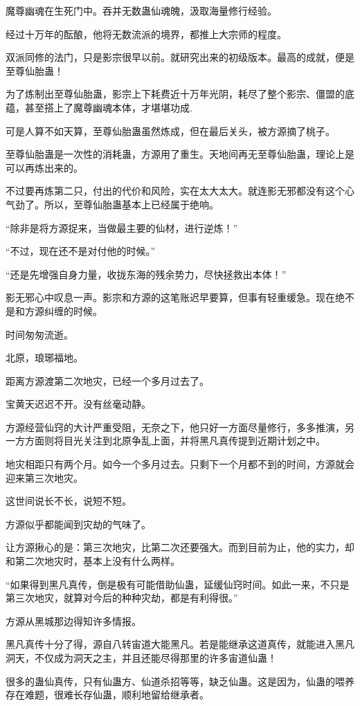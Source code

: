 \begin{this_body}
魔尊幽魂在生死门中。吞并无数蛊仙魂魄，汲取海量修行经验。

经过十万年的酝酿，他将无数流派的境界，都推上大宗师的程度。

双派同修的法门，只是影宗很早以前。就研究出来的初级版本。最高的成就，便是至尊仙胎蛊！

为了炼制出至尊仙胎蛊，影宗上下耗费近十万年光阴，耗尽了整个影宗、僵盟的底蕴，甚至搭上了魔尊幽魂本体，才堪堪功成.

可是人算不如天算，至尊仙胎蛊虽然炼成，但在最后关头，被方源摘了桃子。

至尊仙胎蛊是一次性的消耗蛊，方源用了重生。天地间再无至尊仙胎蛊，理论上是可以再炼出来的。

不过要再炼第二只，付出的代价和风险，实在太大太大。就连影无邪都没有这个心气劲了。所以，至尊仙胎蛊基本上已经属于绝响。

“除非是将方源捉来，当做最主要的仙材，进行逆炼！”

“不过，现在还不是对付他的时候。”

“还是先增强自身力量，收拢东海的残余势力，尽快拯救出本体！”

影无邪心中叹息一声。影宗和方源的这笔账迟早要算，但事有轻重缓急。现在绝不是和方源纠缠的时候。

时间匆匆流逝。

北原，琅琊福地。

距离方源渡第二次地灾，已经一个多月过去了。

宝黄天迟迟不开。没有丝毫动静。

方源经营仙窍的大计严重受阻，无奈之下，他只好一方面尽量修行，多多推演，另一方方面则将目光关注到北原争乱上面，并将黑凡真传提到近期计划之中。

地灾相距只有两个月。如今一个多月过去。只剩下一个月都不到的时间，方源就会迎来第三次地灾。

这世间说长不长，说短不短。

方源似乎都能闻到灾劫的气味了。

让方源揪心的是：第三次地灾，比第二次还要强大。而到目前为止，他的实力，却和第二次地灾时，基本上没有什么两样。

“如果得到黑凡真传，倒是极有可能借助仙蛊，延缓仙窍时间。如此一来，不只是第三次地灾，就算对今后的种种灾劫，都是有利得很。”

方源从黑城那边得知许多情报。

黑凡真传十分了得，源自八转宙道大能黑凡。若是能继承这道真传，就能进入黑凡洞天，不仅成为洞天之主，并且还能尽得那里的许多宙道仙蛊！

很多的蛊仙真传，只有仙蛊方、仙道杀招等等，缺乏仙蛊。这是因为，仙蛊的喂养存在难题，很难长存仙蛊，顺利地留给继承者。


\end{this_body}
